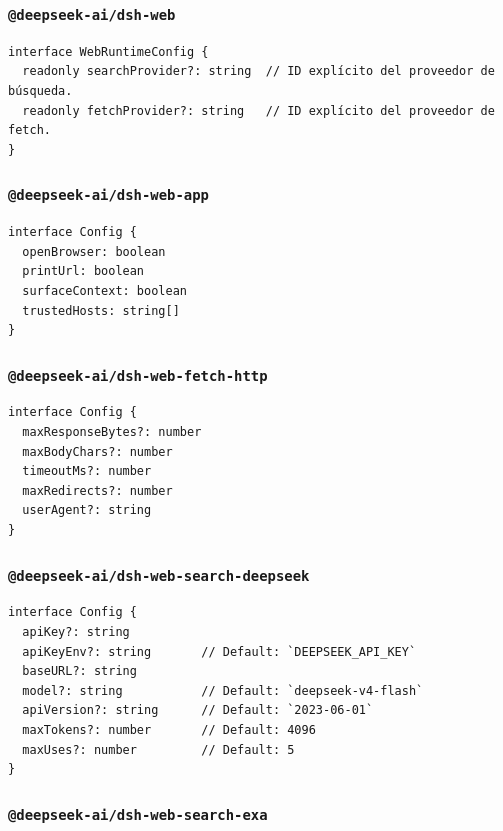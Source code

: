 \documentclass[11pt,a4paper]{article}
\begin{document}
\subsubsection*{\texttt{@deepseek-ai/dsh-web}}


\begin{lstlisting}
interface WebRuntimeConfig {
  readonly searchProvider?: string  // ID explícito del proveedor de búsqueda.
  readonly fetchProvider?: string   // ID explícito del proveedor de fetch.
}
\end{lstlisting}


\subsubsection*{\texttt{@deepseek-ai/dsh-web-app}}


\begin{lstlisting}
interface Config {
  openBrowser: boolean
  printUrl: boolean
  surfaceContext: boolean
  trustedHosts: string[]
}
\end{lstlisting}


\subsubsection*{\texttt{@deepseek-ai/dsh-web-fetch-http}}


\begin{lstlisting}
interface Config {
  maxResponseBytes?: number
  maxBodyChars?: number
  timeoutMs?: number
  maxRedirects?: number
  userAgent?: string
}
\end{lstlisting}


\subsubsection*{\texttt{@deepseek-ai/dsh-web-search-deepseek}}


\begin{lstlisting}
interface Config {
  apiKey?: string
  apiKeyEnv?: string       // Default: `DEEPSEEK_API_KEY`
  baseURL?: string
  model?: string           // Default: `deepseek-v4-flash`
  apiVersion?: string      // Default: `2023-06-01`
  maxTokens?: number       // Default: 4096
  maxUses?: number         // Default: 5
}
\end{lstlisting}


\subsubsection*{\texttt{@deepseek-ai/dsh-web-search-exa}}
\end{document}

